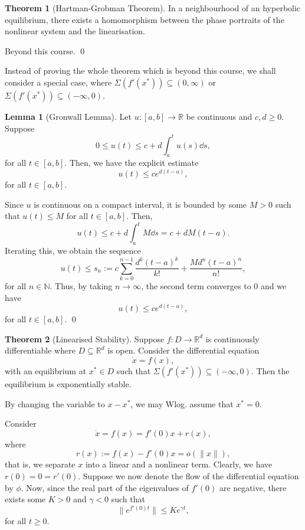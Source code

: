 \documentclass[
]{article}
\theoremstyle{definition}
\newtheorem{theorem}{Theorem}
\theoremstyle{definition}
\newtheorem{lemma}{Lemma}[section]
\begin{document}
\begin{theorem}[Hartman-Grobman Theorem]
  In a neighbourhood of an hyperbolic equilibrium, there exists a homomorphism 
  between the phase portraits of the nonlinear system and the linearisation.
\end{theorem}
\proof

Beyond this course. \qed

Instead of proving the whole theorem which is beyond this course, we
shall consider a special case, where
\(\Sigma(f'(x^*)) \subseteq (0, \infty)\) or
\(\Sigma(f'(x^*)) \subseteq (-\infty, 0)\).

\begin{lemma}[Gronwall Lemma]
  Let \(u : [a, b] \to \mathbb{R}\) be continuous and \(c, d \ge 0\). Suppose 
  \[0 \le u(t) \le c + d \int_a^t u(s) \dd s,\]
  for all \(t \in [a, b]\). Then, we have the explicit estimate 
  \[u(t) \le c e^{d(t - a)},\]
  for all \(t \in [a, b]\).
\end{lemma}
\proof

Since \(u\) is continuous on a compact interval, it is bounded by some
\(M > 0\) such that \(u(t) \le M\) for all \(t \in [a, b]\). Then,
\[u(t) \le c + d \int_a^t M \dd s = c + dM(t - a).\] Iterating this, we
obtain the sequence
\[u(t) \le s_n := c\sum_{k = 0}^{n - 1} \frac{d^k(t - a)^k}{k!} + \frac{Md^n(t - a)^n}{n!},\]
for all \(n \in \mathbb{N}\). Thus, by taking \(n \to \infty\), the
second term converges to 0 and we have \[u(t) \le c e^{d(t - a)},\] for
all \(t \in [a, b]\). \qed

\begin{theorem}[Linearised Stability]
  Suppose \(f : D \to \mathbb{R}^d\) is continuously differentiable where 
  \(D \subseteq \mathbb{R}^d\) is open. Consider the differential equation 
  \[\dot x = f(x),\]
  with an equilibrium at \(x^* \in D\) such that \(\Sigma(f'(x^*)) \subseteq (-\infty, 0)\).
  Then the equilibrium is exponentially stable.
\end{theorem}
\proof

By changing the variable to \(x - x^*\), we may Wlog. assume that
\(x^* = 0\).

Consider \[\dot x = f(x) = f'(0)x + r(x),\] where
\[r(x) := f(x) - f'(0)x = o(\|x\|),\] that is, we separate \(x\) into a
linear and a nonlinear term. Clearly, we have \(r(0) = 0 = r'(0)\).
Suppose we now denote the flow of the differential equation by \(\phi\).
Now, since the real part of the eigenvalues of \(f'(0)\) are negative,
there exists some \(K > 0\) and \(\gamma < 0\) such that
\[\|e^{f'(0)t}\| \le Ke^{\gamma t},\] for all \(t \ge 0\).
\end{document}
